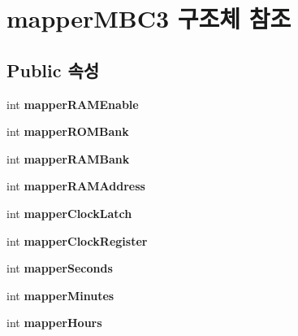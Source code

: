 \hypertarget{structmapper_m_b_c3}{}\section{mapper\+M\+B\+C3 구조체 참조}
\label{structmapper_m_b_c3}
\subsection*{Public 속성}
\begin{DoxyCompactItemize}
\item 
\mbox{\label{structmapper_m_b_c3_af7dc96b2f24755ecba64a07352d09ec7}} 
int {\bfseries mapper\+R\+A\+M\+Enable}
\item 
\mbox{\label{structmapper_m_b_c3_a7a2bf68415cbdab5212e896b4387a1a2}} 
int {\bfseries mapper\+R\+O\+M\+Bank}
\item 
\mbox{\label{structmapper_m_b_c3_a0eca8c8e7b1c8a2b125dc4e12ad7172c}} 
int {\bfseries mapper\+R\+A\+M\+Bank}
\item 
\mbox{\label{structmapper_m_b_c3_a5a8101132357afcbedff9b9a242a2f36}} 
int {\bfseries mapper\+R\+A\+M\+Address}
\item 
\mbox{\label{structmapper_m_b_c3_a7c4d4b0f79f1e91660e0acbe5c1f541d}} 
int {\bfseries mapper\+Clock\+Latch}
\item 
\mbox{\label{structmapper_m_b_c3_a6004623680d6c33c7845ff7cddba3211}} 
int {\bfseries mapper\+Clock\+Register}
\item 
\mbox{\label{structmapper_m_b_c3_a9a361b45b036291bc6b6eaa8f612d3e0}} 
int {\bfseries mapper\+Seconds}
\item 
\mbox{\label{structmapper_m_b_c3_a1accaec3dd364cbd7c511bc30b1a9c69}} 
int {\bfseries mapper\+Minutes}
\item 
\mbox{\label{structmapper_m_b_c3_ae781e00e6d350fcaa9799047005d97fd}} 
int {\bfseries mapper\+Hours}
\item 
\mbox{\label{structmapper_m_b_c3_a0b5ce518ea25e7df36833c2b5ad0ed28}} 

\end{DoxyCompactItemize}
